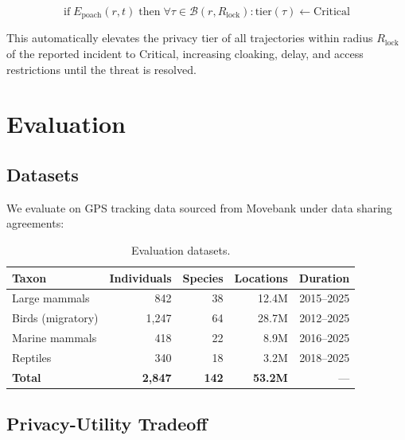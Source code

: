 \documentclass[11pt,letterpaper]{article}
\begin{document}
\begin{equation}
\text{if}\; E_{\text{poach}}(r, t) \;\text{then}\; \forall \tau \in \mathcal{B}(r, R_{\text{lock}}) : \text{tier}(\tau) \leftarrow \text{Critical}
\end{equation}

This automatically elevates the privacy tier of all trajectories within radius $R_{\text{lock}}$ of the reported incident to Critical, increasing cloaking, delay, and access restrictions until the threat is resolved.

\section{Evaluation}

\subsection{Datasets}

We evaluate on GPS tracking data sourced from Movebank under data sharing agreements:

\begin{table}[htbp]
\centering
\caption{Evaluation datasets.}
\label{tab:eval_datasets}
\begin{tabular}{lrrrr}
\toprule
\textbf{Taxon} & \textbf{Individuals} & \textbf{Species} & \textbf{Locations} & \textbf{Duration} \\
\midrule
Large mammals & 842 & 38 & 12.4M & 2015--2025 \\
Birds (migratory) & 1,247 & 64 & 28.7M & 2012--2025 \\
Marine mammals & 418 & 22 & 8.9M & 2016--2025 \\
Reptiles & 340 & 18 & 3.2M & 2018--2025 \\
\midrule
\textbf{Total} & \textbf{2,847} & \textbf{142} & \textbf{53.2M} & --- \\
\bottomrule
\end{tabular}
\end{table}

\subsection{Privacy-Utility Tradeoff}
\end{document}
